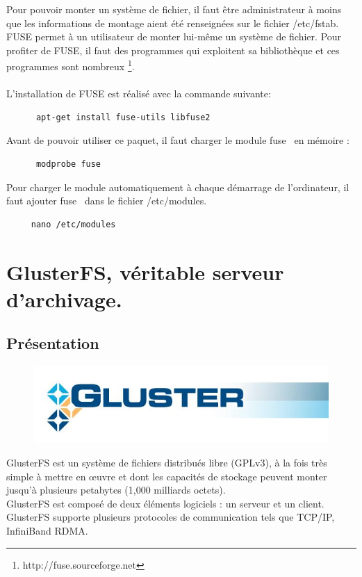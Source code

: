 \documentclass[12pt]{report}
\begin{document}
    Pour pouvoir monter un système de fichier, il faut être administrateur à moins que les informations de montage aient été renseignées sur le fichier /etc/fstab.\\
    FUSE permet à un utilisateur de monter lui-même un système de fichier. Pour profiter de FUSE, il faut des programmes qui exploitent sa bibliothèque et ces programmes sont nombreux \footnote{http://fuse.sourceforge.net}.\\\\
    L'installation de FUSE est réalisé avec la commande suivante:\\
    \begin{lstlisting}
	  apt-get install fuse-utils libfuse2
	  \end{lstlisting}
    Avant de pouvoir utiliser ce paquet, il faut charger le module \og fuse\fg~ en mémoire :\\
    \begin{lstlisting}
	  modprobe fuse
	  \end{lstlisting}
    Pour charger le module automatiquement à chaque démarrage de l'ordinateur, il faut ajouter \og fuse\fg~ dans le fichier \og /etc/modules\fg.\\
    \begin{lstlisting}
	 nano /etc/modules
	 \end{lstlisting}

	\chapter{GlusterFS, véritable serveur d'archivage.}
		\section{Présentation}

		\begin{figure}[H]
			\begin{center}
				\includegraphics[width=0.6\linewidth]{images/glusterfs.png}
			\end{center}
		\end{figure}

GlusterFS est un système de fichiers distribués libre (GPLv3), à la fois très simple à mettre en œuvre et dont les capacités de stockage peuvent monter jusqu'à plusieurs petabytes (1,000 milliards octets).\\
GlusterFS est composé de deux éléments logiciels : un serveur et un client.\\
GlusterFS supporte plusieurs protocoles de communication tels que TCP/IP, InfiniBand RDMA.\\
\end{document}
